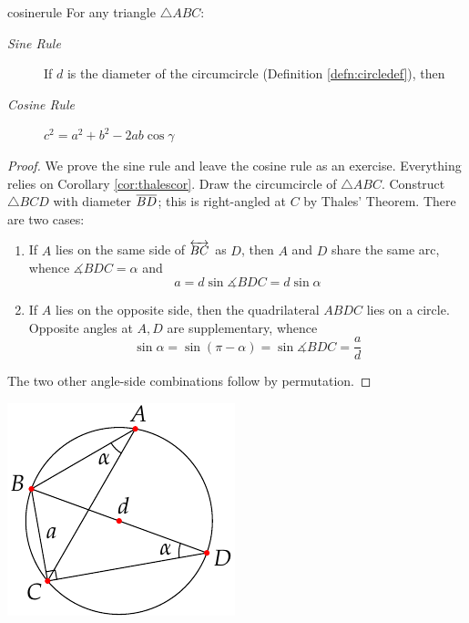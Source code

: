 \begin{thm}{}{cosinerule}
For any triangle $\triangle ABC$:
\begin{description}
\item[\normalfont\emph{Sine Rule}] If $d$ is the diameter of the circumcircle (Definition \ref{defn:circledef}), then \ 
\item[\normalfont\emph{Cosine Rule}] $c^2=a^2+b^2-2ab\cos\gamma$
\end{description}
\end{thm}


\begin{minipage}[t]{0.72\linewidth}\vspace{0pt}
\begin{proof}
We prove the sine rule and leave the cosine rule as an exercise. Everything relies on Corollary \ref{cor:thalescor}. Draw the circumcircle of $\triangle ABC$. Construct $\triangle BCD$ with diameter $\overline{BD}$; this is right-angled at $C$ by Thales' Theorem. There are two cases:
\begin{enumerate}
  \item If $A$ lies on the same side of $\overleftrightarrow{BC}$ as $D$, then $A$ and $D$ share the same arc, whence $\measuredangle BDC=\alpha$ and
  \[a=d\sin\measuredangle BDC=d\sin\alpha\]
  \item If $A$ lies on the opposite side, then the quadrilateral $ABDC$ lies on a circle. Opposite angles at $A,D$ are supplementary, whence
	\[\sin\alpha=\sin(\pi-\alpha)=\sin\measuredangle BDC=\frac ad\]
\end{enumerate}
The two other angle-side combinations follow by permutation.\phantom{\qedhere}
\end{proof}
\end{minipage}\hfill\begin{minipage}[t]{0.25\linewidth}\vspace{-5pt}
\flushright\includegraphics[scale=0.95]{angles-sinerule}\smallbreak

\end{minipage}
